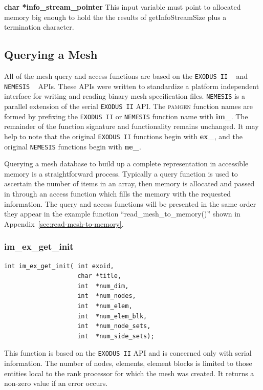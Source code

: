 {\setlength{\parindent}{0pt}
 \textbf{char *info\_stream\_pointer} This input variable must point to allocated memory big enough to hold the the results of getInfoStreamSize plus a termination character.
}
\clearpage
\subsection{Querying a Mesh}
All of the mesh query and access functions are based on the \texttt{EXODUS II} ~\cite{Schoof-Yarberry:1995} and \texttt{NEMESIS} ~\cite{Hennigan-StJohn-Shadid:1998} APIs. These APIs were written to standardize a platform independent interface for writing and reading binary mesh specification files. \texttt{NEMESIS} is a parallel extension of the serial \texttt{EXODUS II} API.  The \textsc{pamgen} function names are formed by prefixing the \texttt{EXODUS II} or \texttt{NEMESIS} function name with \textbf{im\_}. The remainder of the function signature and functionality remains unchanged. It may help to note that the original \texttt{EXODUS II} functions begin with \textbf{ex\_}, and the original \texttt{NEMESIS} functions begin with \textbf{ne\_}.

Querying a mesh database to build up a complete representation in accessible memory is a straightforward process.  Typically a query function is used to ascertain the number of items in an array, then memory is allocated and passed in through an access function which fills the memory with the requested information. The query and access functions will be presented in the same order they appear in the example function ``read\_mesh\_to\_memory()'' shown in Appendix~\ref{sec:read-mesh-to-memory}.


\subsubsection{im\_ex\_get\_init}
{\ttfamily  \begin{verbatim}
int im_ex_get_init( int exoid,
                    char *title,
                    int  *num_dim,
                    int  *num_nodes,
                    int  *num_elem,
                    int  *num_elem_blk,
                    int  *num_node_sets,
                    int  *num_side_sets);
\end{verbatim}}
This function is based on the \texttt{EXODUS II} API and is concerned only with serial information. The number of nodes, elements, element blocks is limited to those entities local to the rank processor for which the mesh was created. It returns a non-zero value if an error occurs.

